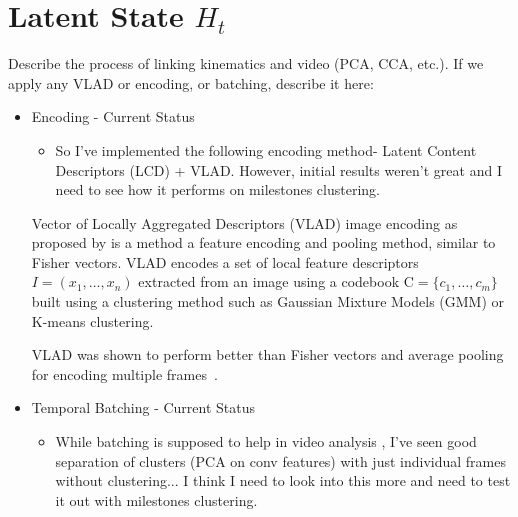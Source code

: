 \section{Latent State $H_t$}
Describe the process of linking kinematics and video (PCA, CCA, etc.).
If we apply any VLAD or encoding, or batching, describe it here:

\begin{itemize}
\item Encoding - Current Status
\begin{itemize}
\item So I've implemented the following encoding method- Latent Content Descriptors (LCD) + VLAD. However, initial results weren't great and I need to see how it performs on milestones clustering.
\end{itemize}


Vector of Locally Aggregated Descriptors (VLAD) image encoding as proposed by \cite{jegou2010aggregating} is a method a feature encoding and pooling method, similar to Fisher vectors. VLAD encodes a set of local feature descriptors $I=(x_1,\ldots,x_n)$ extracted from an image using a codebook $\mathrm{C} = \{c_1, \ldots, c_m \}$ built using a clustering method such as Gaussian Mixture Models (GMM) or K-means clustering.


VLAD was shown to perform better than Fisher vectors and average pooling for encoding multiple frames~\cite{xu2014discriminative}.

\item Temporal Batching - Current Status
\begin{itemize}
\item While batching is supposed to help in video analysis , I've seen good separation of clusters (PCA on conv features) with just individual frames without clustering... I think I need to look into this more and need to test it out with milestones clustering.
\end{itemize}

\end{itemize}
